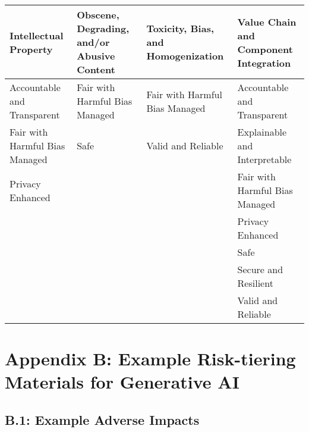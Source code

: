 \documentclass[fleqn]{article}
\begin{document}
\begin{landscape}
\begin{table}[H]
	\begin{tabular}{llll}
		\toprule
		\textbf{Intellectual Property} & \textbf{Obscene, Degrading, and/or Abusive Content} & \textbf{Toxicity, Bias, and Homogenization} & \textbf{Value Chain and Component Integration} \\
		\midrule
		Accountable and Transparent & Fair with Harmful Bias Managed & Fair with Harmful Bias Managed & Accountable and Transparent \\
		Fair with Harmful Bias Managed & Safe & Valid and Reliable & Explainable and Interpretable \\
		Privacy Enhanced &  &  & Fair with Harmful Bias Managed \\
 		&  &  & Privacy Enhanced \\
 		&  &  & Safe \\
 		&  &  & Secure and Resilient \\
 		&  &  & Valid and Reliable \\
		\bottomrule
	\end{tabular}
\end{table}
\vfill
\raisebox{-10pt}{\makebox[\linewidth]{\thepage}}
\end{landscape}

\section*{Appendix B: Example Risk-tiering Materials for Generative AI}\label{sec:appndxb}

\subsection*{B.1: Example Adverse Impacts}
\end{document}
